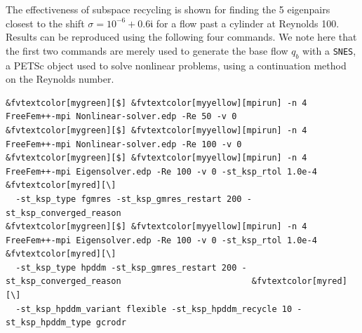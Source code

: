 \documentclass[3p,11pt]{elsarticle}
\newcommand{\pk}[1]{\texttt{#1}}
\begin{document}
The effectiveness of subspace recycling is shown for
finding the 5 eigenpairs closest to the shift $\sigma = 10^{-6} + 0.6\mathfrak{i}$ for a
flow past a cylinder at Reynolds 100. Results can be reproduced using the following four commands.
We note here that the first two commands are merely used to generate
the base flow $q_b$ with a \pk{SNES}, a PETSc object used to solve
nonlinear problems, using a continuation method on the Reynolds number. \\[-4pt]
\begin{Verbatim}[fontsize=\footnotesize,frame=single,framerule=0.1mm,commandchars=&\[\]]
&fvtextcolor[mygreen][$] &fvtextcolor[myyellow][mpirun] -n 4 FreeFem++-mpi Nonlinear-solver.edp -Re 50 -v 0
&fvtextcolor[mygreen][$] &fvtextcolor[myyellow][mpirun] -n 4 FreeFem++-mpi Nonlinear-solver.edp -Re 100 -v 0
&fvtextcolor[mygreen][$] &fvtextcolor[myyellow][mpirun] -n 4 FreeFem++-mpi Eigensolver.edp -Re 100 -v 0 -st_ksp_rtol 1.0e-4                     &fvtextcolor[myred][\]
  -st_ksp_type fgmres -st_ksp_gmres_restart 200 -st_ksp_converged_reason
&fvtextcolor[mygreen][$] &fvtextcolor[myyellow][mpirun] -n 4 FreeFem++-mpi Eigensolver.edp -Re 100 -v 0 -st_ksp_rtol 1.0e-4                     &fvtextcolor[myred][\]
  -st_ksp_type hpddm -st_ksp_gmres_restart 200 -st_ksp_converged_reason                          &fvtextcolor[myred][\]
  -st_ksp_hpddm_variant flexible -st_ksp_hpddm_recycle 10 -st_ksp_hpddm_type gcrodr
\end{Verbatim}
\end{document}
